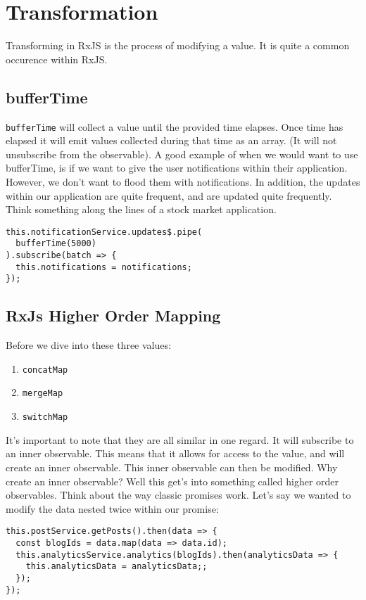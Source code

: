 \chapter{Transformation}
Transforming in RxJS is the process of modifying a value. It is quite a common occurence within RxJS.

\section{bufferTime}
\lstinline{bufferTime} will collect a value until the provided time elapses. Once time has elapsed it will emit values collected during that time as an array. (It will not unsubscribe from the observable). A good example of when we
would want to use bufferTime, is if we want to give the user notifications within their application. However, we don't want to flood them with notifications. In addition, the updates within our application are quite frequent, and are updated quite frequently. Think something along the lines of a stock market application.

\begin{lstlisting}
this.notificationService.updates$.pipe(
  bufferTime(5000)
).subscribe(batch => {
  this.notifications = notifications;
});  
\end{lstlisting}


\section{RxJs Higher Order Mapping}
Before we dive into these three values:
\begin{enumerate}
  \item \lstinline{concatMap}
  \item \lstinline{mergeMap}
  \item \lstinline{switchMap}
\end{enumerate}

It's important to note that they are all similar in one regard. It will subscribe to an inner observable. This means that it allows for access to the value, and will create an inner observable. This inner observable can then be 
modified. Why create an inner observable? Well this get's into something called higher order observables. Think about the way classic promises work. Let's say we wanted to modify the data nested twice within our promise:
\begin{lstlisting}
this.postService.getPosts().then(data => {
  const blogIds = data.map(data => data.id);
  this.analyticsService.analytics(blogIds).then(analyticsData => {
    this.analyticsData = analyticsData;; 
  });
});  
\end{lstlisting}

